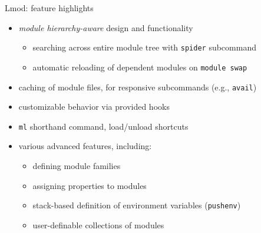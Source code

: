 \documentclass[10pt,xcolor={usenames,dvipsnames}]{beamer}
\begin{document}
\begin{frame}{Lmod: feature highlights}
    \begin{itemize}
        \item \emph{module hierarchy-aware} design and functionality
        \begin{itemize}
            \item searching across entire module tree with \texttt{spider} subcommand
            \item automatic reloading of dependent modules on \texttt{module swap}
        \end{itemize}
        \item caching of module files, for responsive subcommands (e.g., \texttt{avail})
        \item customizable behavior via provided hooks
        \item \texttt{ml} shorthand command, load/unload shortcuts
        \item various advanced features, including:
        \begin{itemize}
            \item defining module families
            \item assigning properties to modules
            \item stack-based definition of environment variables (\texttt{pushenv})
            \item user-definable collections of modules
        \end{itemize}
    \end{itemize}
\end{frame}

\end{document}
